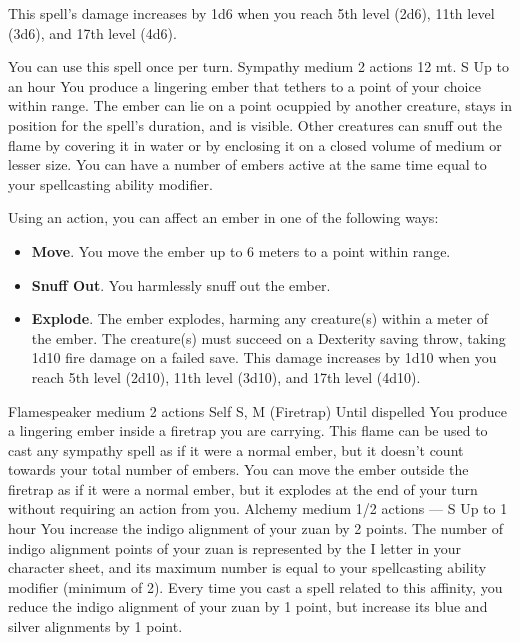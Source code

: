 This spell's damage increases by 1d6 when you reach 5th level (2d6), 11th level (3d6), and 17th level (4d6).

You can use this spell once per turn.
{Sympathy medium}
{2 actions}
{12 mt.}
{S}
{Up to an hour}
You produce a lingering ember that tethers to a point of your choice within range.
The ember can lie on a point ocuppied by another creature, stays in position for the spell's duration, and is visible.
Other creatures can snuff out the flame by covering it in water or by enclosing it on a closed volume of medium or lesser size.
You can have a number of embers active at the same time equal to your spellcasting ability modifier.

Using an action, you can affect an ember in one of the following ways:
\begin{itemize}
    \item \textbf{Move}.
    You move the ember up to 6 meters to a point within range.
    \item \textbf{Snuff Out}.
    You harmlessly snuff out the ember.
    \item \textbf{Explode}.
    The ember explodes, harming any creature(s) within a meter of the ember.
    The creature(s) must succeed on a Dexterity saving throw, taking 1d10 fire damage on a failed save.
    This damage increases by 1d10 when you reach 5th level (2d10), 11th level (3d10), and 17th level (4d10).
\end{itemize}
{Flamespeaker medium}
{2 actions}
{Self}
{S, M (Firetrap)}
{Until dispelled}
You produce a lingering ember inside a firetrap you are carrying.
This flame can be used to cast any sympathy spell as if it were a normal ember, but it doesn't count towards your total number of embers.
You can move the ember outside the firetrap as if it were a normal ember, but it explodes at the end of your turn without requiring an action from you.
    {Alchemy medium}
    {1/2 actions}
    {---}
    {S}
    {Up to 1 hour}
    You increase the indigo alignment of your zuan by 2 points.
    The number of indigo alignment points of your zuan is represented by the I letter in your character sheet, and its maximum number is equal to your spellcasting ability modifier (minimum of 2).
    Every time you cast a spell related to this affinity, you reduce the indigo alignment of your zuan by 1 point, but increase its blue and silver alignments by 1 point.

